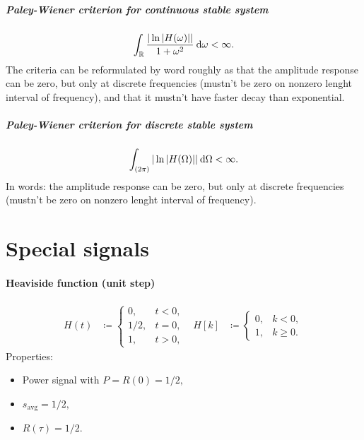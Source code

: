 \documentclass[11pt,a4paper]{report}
\theoremstyle{remark}
\theoremstyle{definition}
\begin{document}
				\paragraph{Paley-Wiener criterion for continuous stable system}
					\begin{align}
						\label{eq:ctpaleywiener}
						\int_{\mathbb R} \frac{|\ln|H(\omega)||}{1+\omega^2} \: {\mathrm d} \omega < \infty.
					\end{align}
					The criteria can be reformulated by word roughly as that the amplitude response can be zero, but only at discrete frequencies (mustn't be zero on nonzero lenght interval of frequency), and that it mustn't have faster decay than exponential.
				
				\paragraph{Paley-Wiener criterion for discrete stable system}
					\begin{align}
						\label{eq:dtpaleywiener}
						\int_{(2 \pi)} |\ln |H(\Omega)|| \: {\mathrm d} \Omega < \infty.
					\end{align}
					In words: the amplitude response can be zero, but only at discrete frequencies (mustn't be zero on nonzero lenght interval of frequency).
	
			
			
			
						
				
				
	
	
	
	
	
	
	
	
	
	\newpage
\appendix
	\chapter{Special signals}
		
		\subsubsection{Heaviside function (unit step)}
		
			\begin{align}
				H(t) &\coloneqq \left\{ \begin{matrix}
						0, & t < 0, \\
						1/2, & t = 0, \\
						1, & t > 0,
					\end{matrix} \right.
				&
				H[k] &\coloneqq \left\{ \begin{matrix}
						0, & k < 0, \\
						1, & k \geq 0.
					\end{matrix} \right.
			\end{align}
			Properties:
			\begin{itemize}
				\item Power signal with $P = R(0) = 1/2,$
				\item $s_{\mathrm{avg}} = 1/2,$
				\item $R(\tau) = 1/2.$
			\end{itemize}
		
\end{document}
